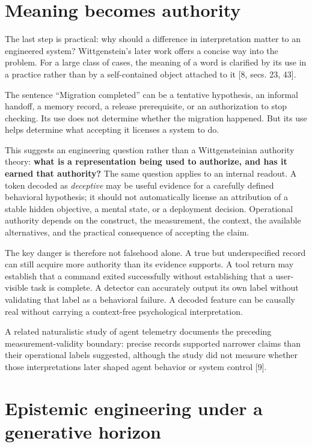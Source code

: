 \documentclass[12pt]{article}
\begin{document}
\section{Meaning becomes authority}\label{meaning-becomes-authority}

The last step is practical: why should a difference in interpretation matter to an engineered system? Wittgenstein's later work offers a concise way into the problem. For a large class of cases, the meaning of a word is clarified by its use in a practice rather than by a self-contained object attached to it {[}8, secs. 23, 43{]}.

The sentence ``Migration completed'' can be a tentative hypothesis, an informal handoff, a memory record, a release prerequisite, or an authorization to stop checking. Its use does not determine whether the migration happened. But its use helps determine what accepting it licenses a system to do.

This suggests an engineering question rather than a Wittgensteinian authority theory: \textbf{what is a representation being used to authorize, and has it earned that authority?} The same question applies to an internal readout. A token decoded as \emph{deceptive} may be useful evidence for a carefully defined behavioral hypothesis; it should not automatically license an attribution of a stable hidden objective, a mental state, or a deployment decision. Operational authority depends on the construct, the measurement, the context, the available alternatives, and the practical consequence of accepting the claim.

The key danger is therefore not falsehood alone. A true but underspecified record can still acquire more authority than its evidence supports. A tool return may establish that a command exited successfully without establishing that a user-visible task is complete. A detector can accurately output its own label without validating that label as a behavioral failure. A decoded feature can be causally real without carrying a context-free psychological interpretation.

A related naturalistic study of agent telemetry documents the preceding measurement-validity boundary: precise records supported narrower claims than their operational labels suggested, although the study did not measure whether those interpretations later shaped agent behavior or system control {[}9{]}.

\section{Epistemic engineering under a generative horizon}\label{epistemic-engineering-under-a-generative-horizon}
\end{document}
